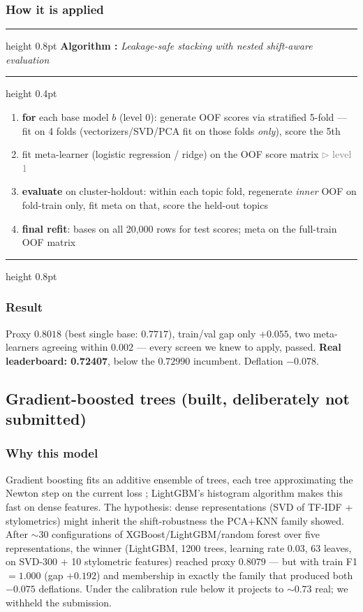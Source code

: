 \documentclass[11pt,a4paper]{article}
\newcounter{algctr}
\newenvironment{algo}[1]{%
  \par\medskip\refstepcounter{algctr}%
  \noindent\hrule height 0.8pt \smallskip
  \noindent\textbf{Algorithm \thealgctr:} \emph{#1}\par\smallskip
  \hrule height 0.4pt \smallskip
  \begin{enumerate}\setlength{\itemsep}{1pt}\setlength{\parskip}{0pt}%
}{%
  \end{enumerate}\smallskip\hrule height 0.8pt \medskip
}
\newcommand{\stateComment}[1]{\hfill\textcolor{gray}{\footnotesize $\triangleright$ #1}}
\begin{document}
\subsubsection{How it is applied}
\begin{algo}{Leakage-safe stacking with nested shift-aware evaluation}
\item \textbf{for} each base model $b$ (level 0): generate OOF scores via stratified 5-fold --- fit on 4 folds (vectorizers/SVD/PCA fit on those folds \emph{only}), score the 5th
\item fit meta-learner (logistic regression / ridge) on the OOF score matrix \stateComment{level 1}
\item \textbf{evaluate} on cluster-holdout: within each topic fold, regenerate \emph{inner} OOF on fold-train only, fit meta on that, score the held-out topics
\item \textbf{final refit}: bases on all 20{,}000 rows for test scores; meta on the full-train OOF matrix
\end{algo}

\subsubsection{Result}
Proxy $0.8018$ (best single base: $0.7717$), train/val gap only $+0.055$, two meta-learners agreeing within $0.002$ --- every screen we knew to apply, passed. \textbf{Real leaderboard: 0.72407}, below the $0.72990$ incumbent. Deflation $-0.078$.

\subsection{Gradient-boosted trees (built, deliberately not submitted)}

\subsubsection{Why this model}
Gradient boosting \cite{friedman2001} fits an additive ensemble of trees, each tree approximating the Newton step on the current loss \cite{chen2016}; LightGBM's histogram algorithm \cite{ke2017} makes this fast on dense features. The hypothesis: dense representations (SVD of TF-IDF + stylometrics) might inherit the shift-robustness the PCA+KNN family showed. After ${\sim}30$ configurations of XGBoost/LightGBM/random forest \cite{breiman2001} over five representations, the winner (LightGBM, 1200 trees, learning rate 0.03, 63 leaves, on SVD-300 + 10 stylometric features) reached proxy $0.8079$ --- but with train F1 $= 1.000$ (gap $+0.192$) and membership in exactly the family that produced both $-0.075$ deflations. Under the calibration rule below it projects to ${\sim}0.73$ real; we withheld the submission.
\end{document}
